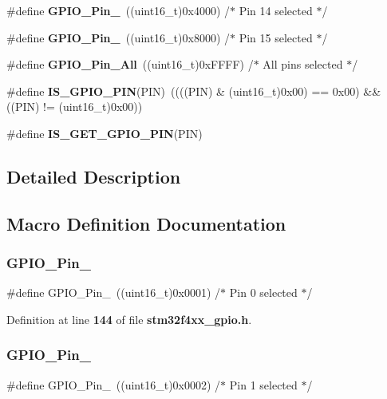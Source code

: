 \begin{DoxyCompactItemize}
\item 
\#define \textbf{ G\+P\+I\+O\+\_\+\+Pin\+\_}~((uint16\+\_\+t)0x4000)  /$\ast$ Pin 14 selected $\ast$/
\item 
\#define \textbf{ G\+P\+I\+O\+\_\+\+Pin\+\_}~((uint16\+\_\+t)0x8000)  /$\ast$ Pin 15 selected $\ast$/
\item 
\#define \textbf{ G\+P\+I\+O\+\_\+\+Pin\+\_\+\+All}~((uint16\+\_\+t)0x\+F\+F\+F\+F)  /$\ast$ All pins selected $\ast$/
\item 
\#define \textbf{ I\+S\+\_\+\+G\+P\+I\+O\+\_\+\+P\+IN}(P\+IN)~((((P\+IN) \& (uint16\+\_\+t)0x00) == 0x00) \&\& ((\+P\+I\+N) != (uint16\+\_\+t)0x00))
\item 
\#define \textbf{ I\+S\+\_\+\+G\+E\+T\+\_\+\+G\+P\+I\+O\+\_\+\+P\+IN}(P\+IN)
\end{DoxyCompactItemize}


\subsection{Detailed Description}


\subsection{Macro Definition Documentation}
\mbox{\label{group__GPIO__pins__define_gab305b8d1be9f89bf2b4a05589b456049}} 
\subsubsection{G\+P\+I\+O\+\_\+\+Pin\+\_}
{\footnotesize\ttfamily \#define G\+P\+I\+O\+\_\+\+Pin\+\_~((uint16\+\_\+t)0x0001)  /$\ast$ Pin 0 selected $\ast$/}



Definition at line \textbf{ 144} of file \textbf{ stm32f4xx\+\_\+gpio.\+h}.

\mbox{\label{group__GPIO__pins__define_ga29db642c26f1fa0fffc3ecadcd30f82b}} 
\subsubsection{G\+P\+I\+O\+\_\+\+Pin\+\_}
{\footnotesize\ttfamily \#define G\+P\+I\+O\+\_\+\+Pin\+\_~((uint16\+\_\+t)0x0002)  /$\ast$ Pin 1 selected $\ast$/}



